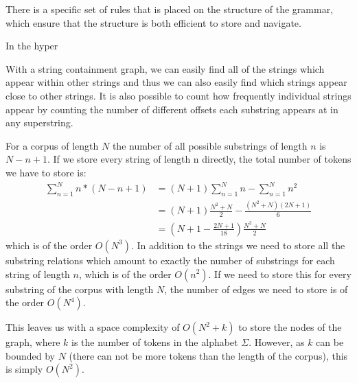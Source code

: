 There is a specific set of rules that is placed on the structure of the grammar, which ensure that the structure is both efficient to store and navigate.

In the hyper

\noindent With a string containment graph, we can easily find all of the strings which appear within other strings and thus we can also easily find which strings appear close to other strings. It is also possible to count how frequently individual strings appear by counting the number of different offsets each substring appears at in any superstring.

For a corpus of length $N$ the number of all possible substrings of length $n$ is $N - n + 1$. If we store every string of length n directly, the total number of tokens we have to store is:
\begin{align*}
    \sum_{n=1}^{N}{n * (N - n + 1)}
    &= (N + 1)\sum_{n=1}^{N}{n} -
    \sum_{n=1}^{N}{n^2}\\
    &= (N + 1)\frac{N^2 + N}{2} - \frac{(N^2 + N)(2N + 1)}{6}\\
    &= (N + 1 - \frac{2N + 1}{18})\frac{N^2 + N}{2}
\end{align*}
which is of the order $O(N^3)$. In addition to the strings we need to store all the substring relations which amount to exactly the number of substrings for each string of length $n$, which is of the order $O(n^2)$. If we need to store this for every substring of the corpus with length $N$, the number of edges we need to store is of the order $O(N^4)$.

\noindent
This leaves us with a space complexity of $O(N^2 + k)$ to store the nodes of the graph, where $k$ is the number of tokens in the alphabet $\Sigma$. However, as $k$ can be bounded by $N$ (there can not be more tokens than the length of the corpus), this is simply $O(N^2)$.